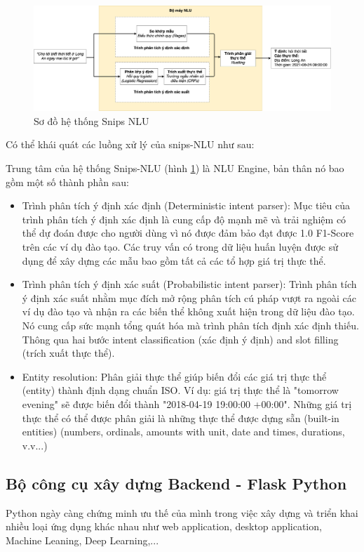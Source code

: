 \begin{figure}[htp]
    \centering
    \includegraphics[width=15cm]{images/Snips-NLU.png}
    \caption{Sơ đồ hệ thống Snips NLU}
    \label{fig:snips-nlu}
\end{figure}

Có thể khái quát các luồng xử lý của snips-NLU \cite{snips-nlu} như sau:

Trung tâm của hệ thống Snips-NLU (hình \ref{fig:snips-nlu}) là NLU Engine, bản thân nó bao gồm một số thành phần sau:
\begin{itemize}
    \item Trình phân tích ý định xác định (Deterministic intent parser): Mục tiêu của trình phân tích ý định xác định là cung cấp độ mạnh mẽ và trải nghiệm có thể dự đoán được cho người dùng vì nó được đảm bảo đạt được 1.0 F1-Score trên các ví dụ đào tạo. Các truy vấn có trong dữ liệu huấn luyện được sử dụng để xây dựng các mẫu bao gồm tất cả các tổ hợp giá trị thực thể.
    \item Trình phân tích ý định xác suất (Probabilistic intent parser): Trình phân tích ý định xác suất nhằm mục đích mở rộng phân tích cú pháp vượt ra ngoài các ví dụ đào tạo và nhận ra các biến thể không xuất hiện trong dữ liệu đào tạo. Nó cung cấp sức mạnh tổng quát hóa mà trình phân tích định xác định thiếu. Thông qua hai bước intent classification (xác định ý định) and slot filling (trích xuất thực thể).
    \item Entity resolution: Phân giải thực thể giúp biến đổi các giá trị thực thể (entity) thành định dạng chuẩn ISO. Ví dụ: giá trị thực thể là "tomorrow evening" sẽ được biến đổi thành "2018-04-19 19:00:00 +00:00". Những giá trị thực thể có thể được phân giải là những thực thể được dựng sẵn (built-in entities) (numbers, ordinals, amounts with unit, date and times, durations, v.v...)
\end{itemize}

\subsection{Bộ công cụ xây dựng Backend - Flask Python}
Python ngày càng chứng minh ưu thế của mình trong việc xây dựng và triển khai nhiều loại ứng dụng khác nhau như web application, desktop application, Machine Leaning, Deep Learning,...

